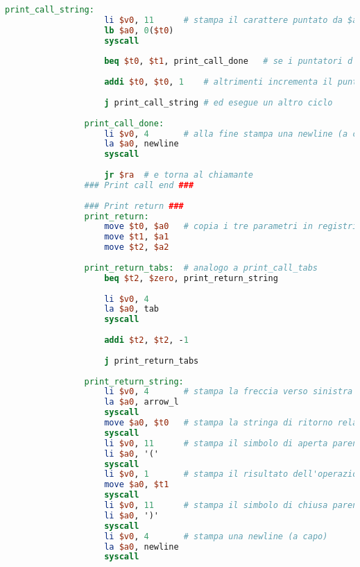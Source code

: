 \begin{center}
\begin{lstlisting}[language=mips, gobble=14, stepnumber=1]
                print_call_string:
                    li $v0, 11      # stampa il carattere puntato da $a0
                    lb $a0, 0($t0)
                    syscall
                    
                    beq $t0, $t1, print_call_done   # se i puntatori d'inizio e di fine coincidono allora la stringa è finita
                    
                    addi $t0, $t0, 1    # altrimenti incrementa il puntatore d'inizio (scorre al prossimo carattere)
                    
                    j print_call_string # ed esegue un altro ciclo
                    
                print_call_done:
                    li $v0, 4       # alla fine stampa una newline (a capo)
                    la $a0, newline
                    syscall
                    
                    jr $ra  # e torna al chiamante
                ### Print call end ###
                
                ### Print return ###
                print_return:
                    move $t0, $a0   # copia i tre parametri in registri temporanei
                    move $t1, $a1
                    move $t2, $a2
                    
                print_return_tabs:  # analogo a print_call_tabs
                    beq $t2, $zero, print_return_string
                    
                    li $v0, 4
                    la $a0, tab
                    syscall
                    
                    addi $t2, $t2, -1
                    
                    j print_return_tabs
                    
                print_return_string:
                    li $v0, 4       # stampa la freccia verso sinistra
                    la $a0, arrow_l
                    syscall
                    move $a0, $t0   # stampa la stringa di ritorno relativa all'operazione
                    syscall
                    li $v0, 11      # stampa il simbolo di aperta parentesi
                    li $a0, '('
                    syscall
                    li $v0, 1       # stampa il risultato dell'operazione
                    move $a0, $t1
                    syscall
                    li $v0, 11      # stampa il simbolo di chiusa parentesi
                    li $a0, ')'
                    syscall
                    li $v0, 4       # stampa una newline (a capo)
                    la $a0, newline
                    syscall
                    

\end{lstlisting}
\end{center}
